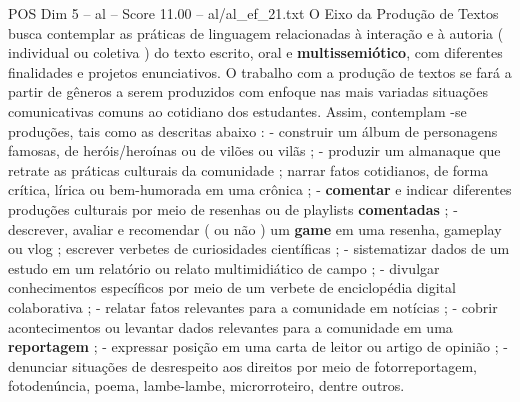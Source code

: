 \begin{textsample}{POS Dim 5 – al – Score 11.00 – al/al\_ef\_21.txt}
O Eixo da Produção de Textos busca contemplar as práticas de linguagem relacionadas à interação e à autoria ( individual ou coletiva ) do texto escrito, oral e \textbf{multissemiótico}, com diferentes finalidades e projetos enunciativos.
O trabalho com a produção de textos se fará a partir de gêneros a serem produzidos com enfoque nas mais variadas situações comunicativas comuns ao cotidiano dos estudantes.
Assim, contemplam -se produções, tais como as descritas abaixo : - construir um álbum de personagens famosas, de heróis/heroínas ou de vilões ou vilãs ; - produzir um almanaque que retrate as práticas culturais da comunidade ; narrar fatos cotidianos, de forma crítica, lírica ou bem-humorada em uma crônica ; - \textbf{comentar} e indicar diferentes produções culturais por meio de resenhas ou de playlists \textbf{comentadas} ; - descrever, avaliar e recomendar ( ou não ) um \textbf{game} em uma resenha, gameplay ou vlog ; escrever verbetes de curiosidades científicas ; - sistematizar dados de um estudo em um relatório ou relato multimidiático de campo ; - divulgar conhecimentos específicos por meio de um verbete de enciclopédia digital colaborativa ; - relatar fatos relevantes para a comunidade em notícias ; - cobrir acontecimentos ou levantar dados relevantes para a comunidade em uma \textbf{reportagem} ; - expressar posição em uma carta de leitor ou artigo de opinião ; - denunciar situações de desrespeito aos direitos por meio de fotorreportagem, fotodenúncia, poema, lambe-lambe, microrroteiro, dentre outros.

\end{textsample}
